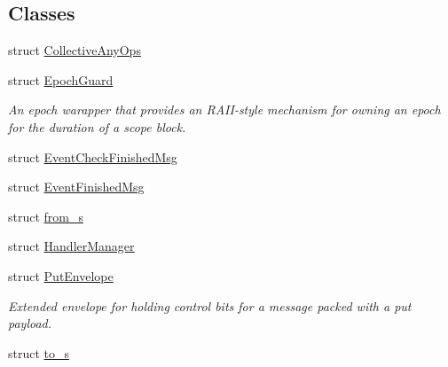 \subsection*{Classes}
\begin{DoxyCompactItemize}
\item 
struct \hyperlink{structvt_1_1_collective_any_ops}{Collective\+Any\+Ops}
\item 
struct \hyperlink{structvt_1_1_epoch_guard}{Epoch\+Guard}
\begin{DoxyCompactList}\small\item\em An epoch warapper that provides an R\+A\+I\+I-\/style mechanism for owning an epoch for the duration of a scope block. \end{DoxyCompactList}\item 
struct \hyperlink{structvt_1_1_event_check_finished_msg}{Event\+Check\+Finished\+Msg}
\item 
struct \hyperlink{structvt_1_1_event_finished_msg}{Event\+Finished\+Msg}
\item 
struct \hyperlink{structvt_1_1from__s}{from\+\_\+s}
\item 
struct \hyperlink{structvt_1_1_handler_manager}{Handler\+Manager}
\item 
struct \hyperlink{structvt_1_1_put_envelope}{Put\+Envelope}
\begin{DoxyCompactList}\small\item\em Extended envelope for holding control bits for a message packed with a put payload. \end{DoxyCompactList}\item 
struct \hyperlink{structvt_1_1to__s}{to\+\_\+s}
\end{DoxyCompactItemize}
